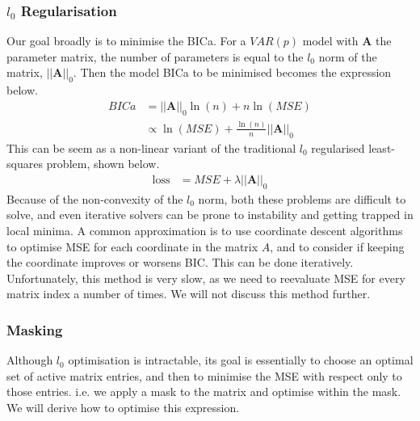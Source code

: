 \documentclass[12pt,a4paper]{article} %
\begin{document}
\subsubsection{$l_0$ Regularisation}
Our goal broadly is to minimise the BICa. For a $VAR(p)$ model with $\pmb{A}$ the parameter matrix, the number of parameters is equal to the $l_0$ norm of the matrix, $||\pmb{A}||_0$. Then the model BICa to be minimised becomes the expression below.
\begin{align*}
    BICa&=||\pmb{A}||_0\ln(n)+n\ln(MSE)\\
    &\propto\ln(MSE)+\frac{\ln(n)}{n}||\pmb{A}||_0
\end{align*}
This can be seem as a non-linear variant of the traditional $l_0$ regularised least-squares problem, shown below.
\begin{align*}
    \text{loss}&=MSE+\lambda||\pmb{A}||_0
\end{align*}
Because of the non-convexity of the $l_0$ norm, both these problems are difficult to solve, and even iterative solvers can be prone to instability and getting trapped in local minima. A common approximation is to use coordinate descent algorithms to optimise MSE for each coordinate in the matrix $A$, and to consider if keeping the coordinate improves or worsens BIC. This can be done iteratively. Unfortunately, this method is very slow, as we need to reevaluate MSE for every matrix index a number of times. We will not discuss this method further.
\subsubsection{Masking}
\label{subsec:masking}
Although $l_0$ optimisation is intractable, its goal is essentially to choose an optimal set of active matrix entries, and then to minimise the MSE with respect only to those entries. i.e. we apply a mask to the matrix and optimise within the mask. We will derive how to optimise this expression.\\
\end{document}
